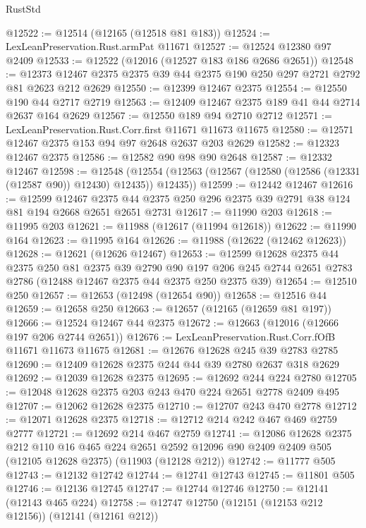 \begin{lexlean}{RustStd}
\begin{coremodule}
@12522 := @12514 (@12165 (@12518 @81 @183))
@12524 := LexLeanPreservation.Rust.armPat @11671
@12527 := @12524 @12380 @97 @2409
@12533 := @12522 (@12016 (@12527 @183 @186 @2686 @2651))
@12548 := @12373 @12467 @2375 @2375 @39 @44 @2375 @190 @250 @297 @2721 @2792 @81 @2623 @212 @2629
@12550 := @12399 @12467 @2375
@12554 := @12550 @190 @44 @2717 @2719
@12563 := @12409 @12467 @2375 @189 @41 @44 @2714 @2637 @164 @2629
@12567 := @12550 @189 @94 @2710 @2712
@12571 := LexLeanPreservation.Rust.Corr.first @11671 @11673 @11675
@12580 := @12571 @12467 @2375 @153 @94 @97 @2648 @2637 @203 @2629
@12582 := @12323 @12467 @2375
@12586 := @12582 @90 @98 @90 @2648
@12587 := @12332 @12467
@12598 := @12548
    (@12554 (@12563 (@12567 (@12580 (@12586 (@12331 (@12587 @90)) @12430) @12435)) @12435))
@12599 := @12442 @12467
@12616 := @12599
    @12467
    @2375
    @44
    @2375
    @250
    @296
    @2375
    @39
    @2791
    @38
    @124
    @81
    @194
    @2668
    @2651
    @2651
    @2731
@12617 := @11990 @203
@12618 := @11995 @203
@12621 := @11988 (@12617 (@11994 @12618))
@12622 := @11990 @164
@12623 := @11995 @164
@12626 := @11988 (@12622 (@12462 @12623))
@12628 := @12621 (@12626 @12467)
@12653 := @12599
    @12628
    @2375
    @44
    @2375
    @250
    @81
    @2375
    @39
    @2790
    @90
    @197
    @206
    @245
    @2744
    @2651
    @2783
    @2786
    (@12488 @12467 @2375 @44 @2375 @250 @2375 @39)
@12654 := @12510 @250
@12657 := @12653 (@12498 (@12654 @90))
@12658 := @12516 @44
@12659 := @12658 @250
@12663 := @12657 (@12165 (@12659 @81 @197))
@12666 := @12524 @12467 @44 @2375
@12672 := @12663 (@12016 (@12666 @197 @206 @2744 @2651))
@12676 := LexLeanPreservation.Rust.Corr.fOfB @11671 @11673 @11675
@12681 := @12676 @12628 @245 @39 @2783 @2785
@12690 := @12409 @12628 @2375 @244 @44 @39 @2780 @2637 @318 @2629
@12692 := @12039 @12628 @2375
@12695 := @12692 @244 @224 @2780
@12705 := @12048 @12628 @2375 @203 @243 @470 @224 @2651 @2778 @2409 @495
@12707 := @12062 @12628 @2375
@12710 := @12707 @243 @470 @2778
@12712 := @12071 @12628 @2375
@12718 := @12712 @214 @242 @467 @469 @2759 @2777
@12721 := @12692 @214 @467 @2759
@12741 := @12086
    @12628
    @2375
    @212
    @110
    @16
    @465
    @224
    @2651
    @2592
    @12096
    @90
    @2409
    @2409
    @505
    (@12105 @12628 @2375)
    (@11903 (@12128 @212))
@12742 := @11777 @505
@12743 := @12132 @12742
@12744 := @12741 @12743
@12745 := @11801 @505
@12746 := @12136 @12745
@12747 := @12744 @12746
@12750 := @12141 (@12143 @465 @224)
@12758 := @12747 @12750 (@12151 (@12153 @212 @12156)) (@12141 (@12161 @212))

\end{coremodule}
\end{lexlean}

